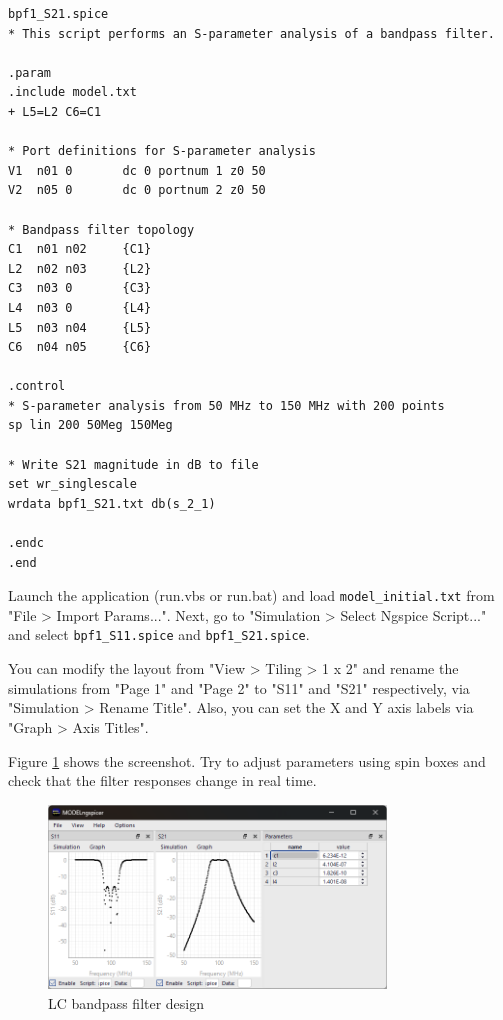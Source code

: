 \documentclass[a4paper,12pt,titlepage]{article}
\begin{document}
\begin{lstlisting}[label=listing08,caption=bpf1\_S21.spice]
bpf1_S21.spice
* This script performs an S-parameter analysis of a bandpass filter.

.param
.include model.txt
+ L5=L2 C6=C1

* Port definitions for S-parameter analysis
V1  n01 0       dc 0 portnum 1 z0 50
V2  n05 0       dc 0 portnum 2 z0 50

* Bandpass filter topology
C1  n01 n02     {C1}
L2  n02 n03     {L2}
C3  n03 0       {C3}
L4  n03 0       {L4}
L5  n03 n04     {L5}
C6  n04 n05     {C6}

.control
* S-parameter analysis from 50 MHz to 150 MHz with 200 points
sp lin 200 50Meg 150Meg

* Write S21 magnitude in dB to file
set wr_singlescale
wrdata bpf1_S21.txt db(s_2_1)

.endc
.end
\end{lstlisting}

Launch the application (run.vbs or run.bat) and load \texttt{model\_initial.txt} from
"File > Import Params...". Next, go to "Simulation > Select Ngspice Script..." and select
\texttt{bpf1\_S11.spice} and \texttt{bpf1\_S21.spice}.

You can modify the layout from "View > Tiling > 1 x 2" and rename the simulations from "Page 1" and
"Page 2" to "S11" and "S21" respectively, via "Simulation > Rename Title". Also, you can set the X
and Y axis labels via "Graph > Axis Titles".

Figure \ref{fig:img03} shows the screenshot. Try to adjust parameters using spin boxes and check
that the filter responses change in real time.

\begin{figure}[htbp]
    \centering
    \includegraphics[width=0.8\textwidth]{images/img03.png}
    \caption{LC bandpass filter design}
    \label{fig:img03}
\end{figure}
\end{document}
